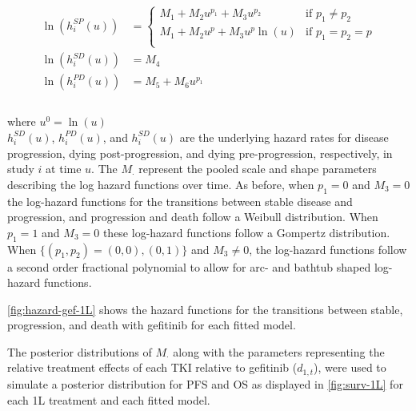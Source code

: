 \documentclass[11pt,final,fleqn]{article}\usepackage[]{graphicx}\usepackage[]{color}
\theoremstyle{plain}
\begin{document}
{\begin{equation}\label{eqn:multistate-ma}
\begin{aligned} 
\ln\left(h_{i}^{SP}(u)\right) &= 
\begin{cases}
M_{1} + M_{2}u^{p_1} + M_{3}u^{p_2} & \text{if } p_1 \neq p_2 \\ 
M_{1} + M_{2}u^{p} + M_{3}u^{p}\ln(u) & \text{if } p_1 = p_2 = p \\ 
\end{cases}\\ 
\ln\left(h_{i}^{SD}(u)\right) &=
M_{4}\\
\ln\left(h_{i}^{PD}(u)\right) &=
M_{5} + M_{6}u^{p_1}\\ 
\\
\end{aligned}
\end{equation}

where $u^0= \ln(u)$
\\

$h_{i}^{SD}(u)$, $h_{i}^{PD}(u)$, and $h_{i}^{SD}(u)$ are the underlying hazard rates for disease progression, dying post-progression, and dying pre-progression, respectively, in study $i$ at time $u$. The $M_{\cdot}$ represent the pooled scale and shape parameters describing the log hazard functions over time. As before, when $p_{1}=0$ and $M_{3}=0$ the log-hazard functions for the transitions between stable disease and progression, and progression and death follow a Weibull distribution. When $p_{1}=1$ and $M_{3}=0$ these log-hazard functions follow a Gompertz distribution. When $\{(p_1, p_2) = (0, 0), (0,1)\}$ and $M_{3}\neq0$, the log-hazard functions follow a second order fractional polynomial to allow for arc- and bathtub shaped log-hazard functions. 

\autoref{fig:hazard-gef-1L} shows the hazard functions for the transitions between stable, progression, and death with gefitinib for each fitted model.

The posterior distributions of $M_{\cdot}$ along with the parameters representing the relative treatment effects of each TKI relative to gefitinib ($d_{1, t}$), were used to simulate a posterior distribution for PFS and OS as displayed in \autoref{fig:surv-1L} for each 1L treatment and each fitted model. 


}
\end{document}
